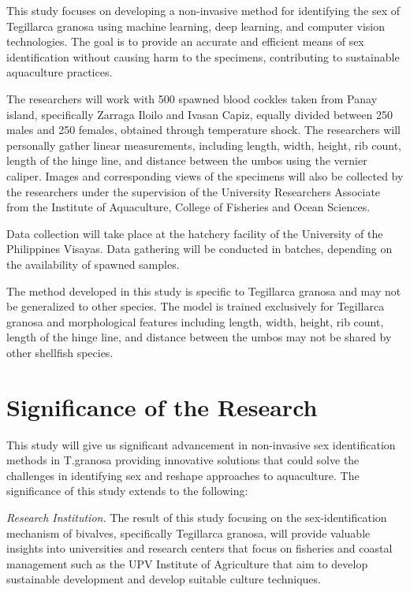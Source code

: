 This study focuses on developing a non-invasive method for identifying the sex of Tegillarca granosa using machine learning, deep learning, and computer vision technologies. The goal is to provide an accurate and efficient means of sex identification without causing harm to the specimens, contributing to sustainable aquaculture practices.

The researchers will work with 500 spawned blood cockles taken from Panay island, specifically Zarraga Iloilo and Ivasan Capiz, equally divided between 250 males and 250 females, obtained through temperature shock. The researchers will personally gather linear measurements, including length, width, height, rib count, length of the hinge line, and distance between the umbos using the vernier caliper. Images and corresponding views of the specimens will also be collected by the researchers under the supervision of the University Researchers Associate from the Institute of Aquaculture, College of Fisheries and Ocean Sciences.

Data collection will take place at the hatchery facility of the University of the Philippines Visayas. Data gathering will be conducted in batches, depending on the availability of spawned samples.

The method developed in this study is specific to Tegillarca granosa and may not be generalized to other species. The model is trained exclusively for Tegillarca granosa and  morphological features including length, width, height, rib count, length of the hinge line, and distance between the umbos may not be shared by other shellfish species. 

\section{Significance of the Research}
\label{sec:significance}

This study will give us significant advancement in non-invasive sex identification methods in T.granosa providing innovative solutions that could solve the challenges in identifying sex  and reshape approaches to aquaculture. The significance of this study extends to the following:

 \textit{Research Institution.} The result of this study focusing on the sex-identification mechanism of bivalves, specifically Tegillarca granosa, will provide valuable insights into universities and research centers that focus on fisheries and coastal management such as the UPV Institute of Agriculture that aim to develop sustainable development and develop suitable culture techniques.

